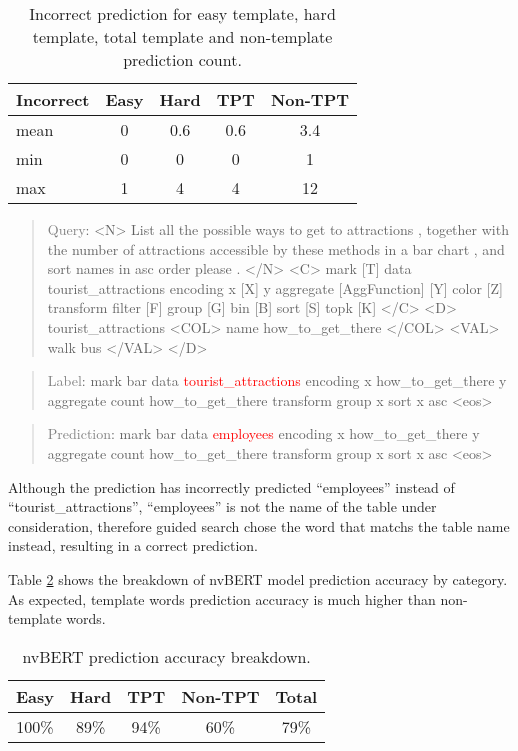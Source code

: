 \documentclass[
	a4paper, %
	10pt, %
	unnumberedsections, %
	twoside, %
]{t0003}
\newcommand{\gray}[1]{\textcolor{gray}{#1}}
\newcommand{\red}[1]{\textcolor{red}{#1}}
\begin{document}
\begin{table}
	\caption{Incorrect prediction for easy template, hard template, total template and non-template prediction count.}
	\centering
	\begin{tabular}{lcccc}
		\toprule
		Incorrect & Easy & Hard & TPT & Non-TPT  \\
		\midrule
		mean & 0 & 0.6 & 0.6 & 3.4 \\
                  min & 0 & 0 & 0 & 1 \\
                  max & 1 & 4 & 4 & 12 \\
		\bottomrule
	\end{tabular}
	\label{tab:incorrectcount}
\end{table}

\begin{quote}
\gray{Query}: <N> List all the possible ways to get to attractions , together with the number of attractions accessible by these methods in a bar chart , and sort names in asc order please . </N> <C> mark [T] data tourist\_attractions encoding x [X] y aggregate [AggFunction] [Y] color [Z] transform filter [F] group [G] bin [B] sort [S] topk [K] </C> <D> tourist\_attractions <COL> name how\_to\_get\_there </COL> <VAL> walk bus </VAL> </D>
\end{quote}

\begin{quote}
\gray{Label}: mark bar data \red{tourist\_attractions} encoding x how\_to\_get\_there y aggregate count how\_to\_get\_there transform group x sort x asc <eos>
\end{quote}

\begin{quote}
\gray{Prediction}: mark bar data \red{employees} encoding x how\_to\_get\_there y aggregate count how\_to\_get\_there transform group x sort x asc <eos>
\end{quote}

Although the prediction has incorrectly predicted ``employees'' instead of ``tourist\_attractions'', ``employees'' is not the name of the table under consideration, therefore guided search chose the word that matchs the table name instead, resulting in a correct prediction.

Table \ref{tab:accuracybreakdown} shows the breakdown of nvBERT model prediction accuracy by category. As expected, template words prediction accuracy is much higher than non-template words.  

\begin{table}
	\caption{nvBERT prediction accuracy breakdown.}
	\centering
	\begin{tabular}{ccccc }
		\toprule
		Easy & Hard & TPT & Non-TPT & Total  \\
		\midrule
		100\% & 89\% & 94\% & 60\% & 79\% \\
		\bottomrule
	\end{tabular}
	\label{tab:accuracybreakdown}
\end{table}
\end{document}
